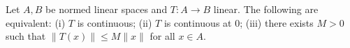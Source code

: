 Let $A, B$ be normed linear spaces and $T : A \to B$ linear. The following are equivalent: (i) $T$ is continuous; (ii) $T$ is continuous at 0; (iii) there exists $M > 0$ such that $\|T(x)\| \leq M\|x\|$ for all $x \in A$.
